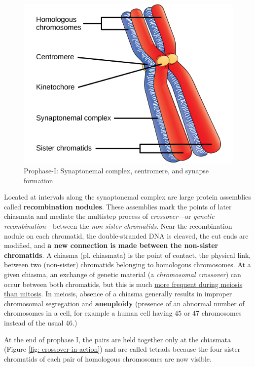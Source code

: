\documentclass[12pt]{article}
\begin{document}
\begin{enumerate}
\begin{figure}[h!]
    \includegraphics[scale=0.4]{synapse-formation.jpeg}
    \caption{Prophase-I: Synaptonemal complex, centromere, and synapse formation}
    \label{fig: synapse-formation}
\end{figure}
        Located at intervals along the synaptonemal complex are large protein assemblies called \textbf{recombination nodules}. These assemblies mark the points of later chiasmata and mediate the multistep process of \emph{crossover}—or \emph{genetic recombination}—between the \emph{non-sister chromatids}. Near the recombination nodule on each chromatid, the double-stranded DNA is cleaved, the cut ends are modified, and \textbf{a new connection is made between the non-sister chromatids}. A chiasma (pl. chiasmata) is the point of contact, the physical link, between two (non-sister) chromatids belonging to homologous chromosomes. At a given chiasma, an exchange of genetic material (a \emph{chromosomal crossover}) can occur between both chromatids, but this is much \href{https://en.wikipedia.org/wiki/Chiasma_(genetics)}{more frequent during meiosis than mitosis}. In meiosis, absence of a chiasma generally results in improper chromosomal segregation and \textbf{aneuploidy} (presence of an abnormal number of chromosomes in a cell, for example a human cell having 45 or 47 chromosomes instead of the usual 46.)

        At the end of prophase I, the pairs are held together only at the chiasmata (Figure \ref{fig: crossover-in-action}) and are called tetrads because the four sister chromatids of each pair of homologous chromosomes are now visible.


\end{enumerate}
\end{document}
